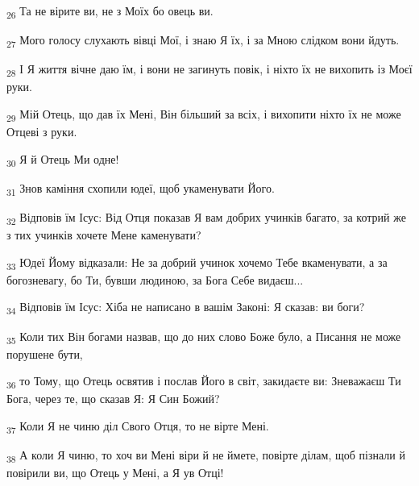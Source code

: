 \begin{tcolorbox}
\textsubscript{26} Та не вірите ви, не з Моїх бо овець ви.
\end{tcolorbox}
\begin{tcolorbox}
\textsubscript{27} Мого голосу слухають вівці Мої, і знаю Я їх, і за Мною слідком вони йдуть.
\end{tcolorbox}
\begin{tcolorbox}
\textsubscript{28} І Я життя вічне даю їм, і вони не загинуть повік, і ніхто їх не вихопить із Моєї руки.
\end{tcolorbox}
\begin{tcolorbox}
\textsubscript{29} Мій Отець, що дав їх Мені, Він більший за всіх, і вихопити ніхто їх не може Отцеві з руки.
\end{tcolorbox}
\begin{tcolorbox}
\textsubscript{30} Я й Отець Ми одне!
\end{tcolorbox}
\begin{tcolorbox}
\textsubscript{31} Знов каміння схопили юдеї, щоб укаменувати Його.
\end{tcolorbox}
\begin{tcolorbox}
\textsubscript{32} Відповів їм Ісус: Від Отця показав Я вам добрих учинків багато, за котрий же з тих учинків хочете Мене каменувати?
\end{tcolorbox}
\begin{tcolorbox}
\textsubscript{33} Юдеї Йому відказали: Не за добрий учинок хочемо Тебе вкаменувати, а за богозневагу, бо Ти, бувши людиною, за Бога Себе видаєш...
\end{tcolorbox}
\begin{tcolorbox}
\textsubscript{34} Відповів їм Ісус: Хіба не написано в вашім Законі: Я сказав: ви боги?
\end{tcolorbox}
\begin{tcolorbox}
\textsubscript{35} Коли тих Він богами назвав, що до них слово Боже було, а Писання не може порушене бути,
\end{tcolorbox}
\begin{tcolorbox}
\textsubscript{36} то Тому, що Отець освятив і послав Його в світ, закидаєте ви: Зневажаєш Ти Бога, через те, що сказав Я: Я Син Божий?
\end{tcolorbox}
\begin{tcolorbox}
\textsubscript{37} Коли Я не чиню діл Свого Отця, то не вірте Мені.
\end{tcolorbox}
\begin{tcolorbox}
\textsubscript{38} А коли Я чиню, то хоч ви Мені віри й не ймете, повірте ділам, щоб пізнали й повірили ви, що Отець у Мені, а Я ув Отці!
\end{tcolorbox}
